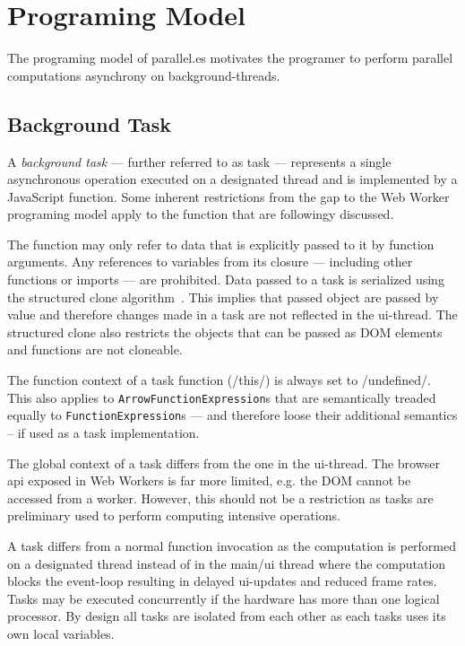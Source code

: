 \section{Programing Model}\label{sec:programing-model}
The programing model of parallel.es motivates the programer to perform parallel computations asynchrony on background-threads. 

\subsection{Background Task}
A \textit{background task} --- further referred to as task --- represents a single asynchronous operation executed on a designated thread and is implemented by a JavaScript function. Some inherent restrictions from the gap to the Web Worker programing model apply to the function that are followingy discussed.

The function may only refer to data that is explicitly passed to it by function arguments. Any references to variables from its closure --- including other functions or imports --- are prohibited. Data passed to a task is serialized using the structured clone algorithm~\cite[Section 2.9.4]{WHATWG2016}. This implies that passed object are passed by value and therefore changes made in a task are not reflected in the ui-thread. The structured clone also restricts the objects that can be passed as DOM elements and functions are not cloneable. 

The function context of a task function (\javascriptinline/this/) is always set to \javascriptinline/undefined/. This also applies to \texttt{ArrowFunctionExpression}s that are semantically treaded equally to \texttt{FunctionExpression}s --- and therefore loose their additional semantics -- if used as a task implementation.

The global context of a task differs from the one in the ui-thread. The browser api exposed in Web Workers is far more limited, e.g. the DOM cannot be accessed from a worker. However, this should not be a restriction as tasks are preliminary used to perform computing intensive operations. 

A task differs from a normal function invocation as the computation is performed on a designated thread instead of in the main/ui thread where the computation blocks the event-loop resulting in delayed ui-updates and reduced frame rates. Tasks may be executed concurrently if the hardware has more than one logical processor. By design all tasks are isolated from each other as each tasks uses its own local variables.

